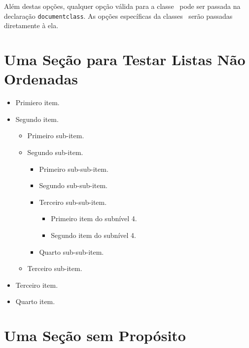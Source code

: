 \documentclass[times,english,brazil,oneside,section=TITLE]{ifes8}
\begin{document}
Além destas opções, qualquer opção válida para a classe \abnTeX\ pode
ser passada na declaração \texttt{documentclass}. As opções
específicas da classes \abnTeX\ serão passadas diretamente à ela.


\section{Uma Seção para Testar Listas Não Ordenadas}

\blindtext[1]

\begin{itemize}
\item Primiero item.
\item Segundo item.
  \begin{itemize}
  \item Primeiro sub-item.
  \item Segundo sub-item.
    \begin{itemize}
    \item Primeiro sub-sub-item.
    \item Segundo sub-sub-item.
    \item Terceiro sub-sub-item.
      \begin{itemize}
      \item Primeiro item do subnível 4.
      \item Segundo item do subnível 4.
      \end{itemize}
    \item Quarto sub-sub-item.
    \end{itemize}
  \item Terceiro sub-item.
  \end{itemize}
\item Terceiro item.
\item Quarto item.
\end{itemize}

\blindtext[2]


\section{Uma Seção sem Propósito}
\label{sec:sem-proposito1}

\Blindtext

\blinditemize[7]

\blindtext[2]

\blindenumerate[5]

\blindtext



\end{document}
